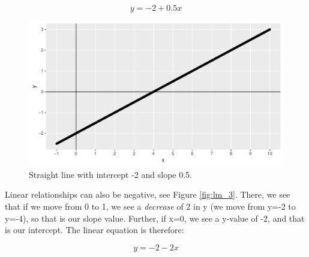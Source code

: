\documentclass[]{report}\usepackage[]{graphicx}\usepackage[]{color}
\makeatletter
\def\maxwidth{ %
  \ifdim\Gin@nat@width>\linewidth
    \linewidth
  \else
    \Gin@nat@width
  \fi
}
\newenvironment{knitrout}{}{} %
\makeatother
\begin{document}
\begin{equation}
y = -2 + 0.5 x
\end{equation}



\begin{knitrout}
\color{fgcolor}\begin{figure}

{\centering \includegraphics[width=\maxwidth]{figure/lm_2-1} 

}

\caption[Straight line with intercept -2 and slope 0.5]{Straight line with intercept -2 and slope 0.5.}\label{fig:lm_2}
\end{figure}


\end{knitrout}


Linear relationships can also be negative, see Figure \ref{fig:lm_3}. There, we see that if we move from 0 to 1, we see a \textit{decrease} of 2 in y (we move from y=-2 to y=-4), so that is our slope value. Further, if x=0, we see a y-value of -2, and that is our intercept. The linear equation is therefore:

\begin{equation}
y = -2 - 2 x
\end{equation}
\end{document}
